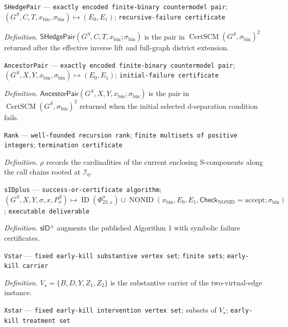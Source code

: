 \documentclass{article}
\begin{document}
\begin{itemize}
{{{{  \item \texttt{SHedgePair} --- \texttt{exactly encoded finite-\allowbreak{}binary countermodel pair}; \((G^S,C,T,x_{\mathrm{bin}},\sigma_{\mathrm{bin}})\mapsto(E_0,E_1)\); \texttt{recursive-\allowbreak{}failure certificate}
  \par\smallskip\noindent\emph{Definition.} \(\mathsf{SHedgePair}(G^S,C,T,x_{\mathrm{bin}};\sigma_{\mathrm{bin}})\) is the pair in \(\operatorname{CertSCM}(G^S,\sigma_{\mathrm{bin}})^2\) returned after the effective inverse lift and full-graph district extension.
  \item \texttt{AncestorPair} --- \texttt{exactly encoded finite-\allowbreak{}binary countermodel pair}; \((G^S,X,Y,x_{\mathrm{bin}},\sigma_{\mathrm{bin}})\mapsto(E_0,E_1)\); \texttt{initial-\allowbreak{}failure certificate}
  \par\smallskip\noindent\emph{Definition.} \(\mathsf{AncestorPair}(G^S,X,Y,x_{\mathrm{bin}};\sigma_{\mathrm{bin}})\) is the pair in \(\operatorname{CertSCM}(G^S,\sigma_{\mathrm{bin}})^2\) returned when the initial selected d-separation condition fails.
  \item \texttt{Rank} --- \texttt{well-\allowbreak{}founded recursion rank}; \texttt{finite multisets of positive integers}; \texttt{termination certificate}
  \par\smallskip\noindent\emph{Definition.} \(\rho\) records the cardinalities of the current enclosing S-components along the call chains rooted at \(\mathcal I_0\).
  \item \texttt{sIDplus} --- \texttt{success-\allowbreak{}or-\allowbreak{}certificate algorithm}; \((G^S,X,Y,\sigma,x,P_\sigma^S)\mapsto\operatorname{ID}(\Phi_{23,x}^{\sigma})\cup\operatorname{NONID}(x_{\mathrm{bin}},E_0,E_1,\mathsf{Check}_{\mathrm{NONID}}=\mathrm{accept};\sigma_{\mathrm{bin}})\); \texttt{executable deliverable}
  \par\smallskip\noindent\emph{Definition.} \(\mathsf{sID}^{\pm}\) augments the published Algorithm 1 with symbolic failure certificates.
  \item \texttt{Vstar} --- \texttt{fixed early-\allowbreak{}kill substantive vertex set}; \texttt{finite sets}; \texttt{early-\allowbreak{}kill carrier}
  \par\smallskip\noindent\emph{Definition.} \(V_\star=\{B,D,Y,Z_1,Z_2\}\) is the substantive carrier of the two-virtual-edge instance.
  \item \texttt{Xstar} --- \texttt{fixed early-\allowbreak{}kill intervention vertex set}; subsets of \(V_\star\); \texttt{early-\allowbreak{}kill treatment set}
}}}}
\end{itemize}
\end{document}
